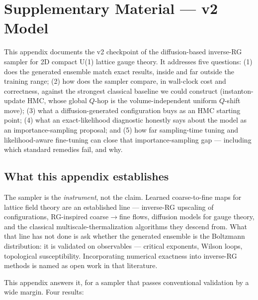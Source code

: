 
\section{Supplementary Material --- v2 Model}
\label{sec:appendix-v2}

This appendix documents the v2 checkpoint of the diffusion-based inverse-RG
sampler for 2D compact U(1) lattice gauge theory. It addresses five
questions: (1) does the generated ensemble match exact results, inside and
far outside the training range; (2) how does the sampler compare, in
wall-clock cost and correctness, against the strongest classical baseline we
could construct (instanton-update HMC, whose global $Q$-hop is the
volume-independent uniform $Q$-shift move); (3) what a diffusion-generated
configuration buys as an HMC starting point; (4) what an
exact-likelihood diagnostic honestly says about the model as an
importance-sampling proposal; and (5) how far sampling-time tuning and
likelihood-aware fine-tuning can close that importance-sampling gap ---
including which standard remedies fail, and why.

\subsection{What this appendix establishes}
\label{sec:appendix-v2-contributions}

The sampler is the \emph{instrument}, not the claim. Learned coarse-to-fine
maps for lattice field theory are an established line --- inverse-RG
upscaling of configurations, RG-inspired coarse$\to$fine flows, diffusion
models for gauge theory, and the classical multiscale-thermalization
algorithms they descend from. What that line has not done is ask whether the
generated ensemble is the Boltzmann distribution: it is validated on
observables --- critical exponents, Wilson loops, topological
susceptibility. Incorporating numerical exactness into inverse-RG methods is
named as open work in that literature.

This appendix answers it, for a sampler that passes conventional validation
by a wide margin. Four results:

